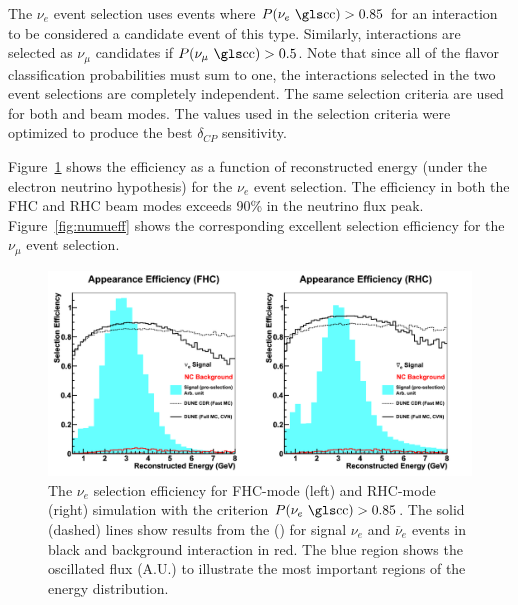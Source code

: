 The $\nu_e$  event selection uses events where $P(\nu_e \textrm{ \dword{cc}}) > 0.85$ for an interaction to be considered a candidate event of this type. Similarly, interactions are selected as $\nu_\mu$  candidates if $P(\nu_\mu \textrm{ \dword{cc}}) > 0.5$. Note that since all of the flavor classification probabilities must sum to one, the interactions selected in the two event selections are completely independent. The same selection criteria are used for both  and  beam modes. The values used in the selection criteria were optimized to produce the best $\delta_{CP}$ sensitivity.

Figure~\ref{fig:nueeff} shows the efficiency as a function of reconstructed energy (under the electron neutrino hypothesis) for the $\nu_e$ event selection. The efficiency in both the FHC and RHC beam modes exceeds 90\% in the neutrino flux peak.  
Figure~\ref{fig:numueff} shows the corresponding excellent selection efficiency for the $\nu_\mu$ event selection.

\begin{figure}
    \centering
		\includegraphics[width=0.9\linewidth]{graphics/cpv_compare_effs_cvnvcdr_dec2018_newcolor.png} %
	\caption[The $\nu_e$ CC selection efficiency for $P(\nu_e \textrm{CC}) > 0.85$]{The $\nu_e$  selection efficiency for FHC-mode (left) and RHC-mode (right) simulation with the criterion $P(\nu_e \textrm{ \dword{cc}}) > 0.85$. The solid (dashed) lines show results from the  () for signal $\nu_e$  and $\bar{\nu}_e$  events in black and  background interaction in red. The blue region shows the oscillated flux (A.U.) to illustrate the most important regions of the energy distribution.}
    \label{fig:nueeff}
\end{figure}

